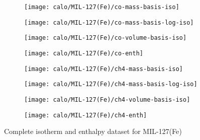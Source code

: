 \begin{figure}[H]
    \begin{subfigure}{0.25\textwidth}
        \texttt{[image: calo/MIL-127(Fe)/co-mass-basis-iso]}%
        \label{appx:fig:shaping:mil127comass}
    \end{subfigure}%
    \begin{subfigure}{0.25\textwidth}
        \texttt{[image: calo/MIL-127(Fe)/co-mass-basis-log-iso]}%
        \label{appx:fig:shaping:mil127comasslog}
    \end{subfigure}%
    \begin{subfigure}{0.25\textwidth}
        \texttt{[image: calo/MIL-127(Fe)/co-volume-basis-iso]}%
        \label{appx:fig:shaping:mil127covolume}
    \end{subfigure}%
    \begin{subfigure}{0.25\textwidth}
        \texttt{[image: calo/MIL-127(Fe)/co-enth]}%
        \label{appx:fig:shaping:mil127coenth}
    \end{subfigure}%

    \begin{subfigure}{0.25\textwidth}
        \texttt{[image: calo/MIL-127(Fe)/ch4-mass-basis-iso]}%
        \label{appx:fig:shaping:mil127ch4mass}
    \end{subfigure}%
    \begin{subfigure}{0.25\textwidth}
        \texttt{[image: calo/MIL-127(Fe)/ch4-mass-basis-log-iso]}%
        \label{appx:fig:shaping:mil127ch4masslog}
    \end{subfigure}%
    \begin{subfigure}{0.25\textwidth}
        \texttt{[image: calo/MIL-127(Fe)/ch4-volume-basis-iso]}%
        \label{appx:fig:shaping:mil127ch4volume}
    \end{subfigure}%
    \begin{subfigure}{0.25\textwidth}
        \texttt{[image: calo/MIL-127(Fe)/ch4-enth]}%
        \label{appx:fig:shaping:mil127ch4enth}
    \end{subfigure}%

    \caption{Complete isotherm and enthalpy dataset for MIL-127(Fe)}
    
\end{figure}

